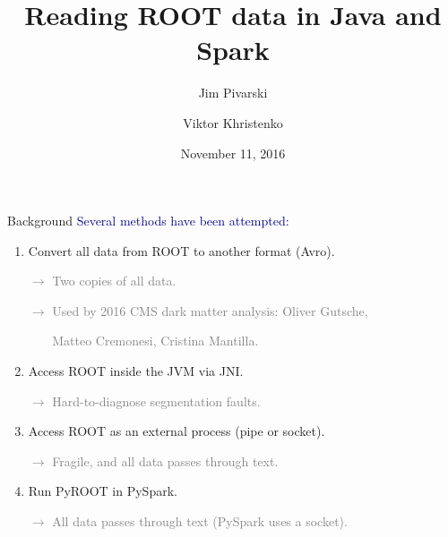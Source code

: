 \documentclass{beamer}
\title[2016-11-10-lucaetal-root4j]{Reading ROOT data in Java and Spark}
\author{Jim Pivarski \and Viktor Khristenko}
\institute{Princeton/DIANA-HEP \and University of Iowa}
\date{November 11, 2016}
\begin{document}

\begin{frame}
  \titlepage
\end{frame}



\begin{frame}{Background}
\textcolor{darkblue}{Several methods have been attempted:}

\begin{enumerate}
\item Convert all data from ROOT to another format (Avro).

\textcolor{gray}{$\rightarrow$ Two copies of all data.}

\textcolor{gray}{$\rightarrow$} \textcolor{gray}{Used by 2016 CMS dark matter analysis: Oliver Gutsche,}

\textcolor{white}{$\rightarrow$} \textcolor{gray}{Matteo Cremonesi, Cristina Mantilla.}

\item<2-> Access ROOT inside the JVM via JNI.

\textcolor{gray}{$\rightarrow$ Hard-to-diagnose segmentation faults.}

\item<3-> Access ROOT as an external process (pipe or socket).

\textcolor{gray}{$\rightarrow$ Fragile, and all data passes through text.}

\item<4-> Run PyROOT in PySpark.

\textcolor{gray}{$\rightarrow$ All data passes through text (PySpark uses a socket).}

\end{enumerate}
\end{frame}
\end{document}
